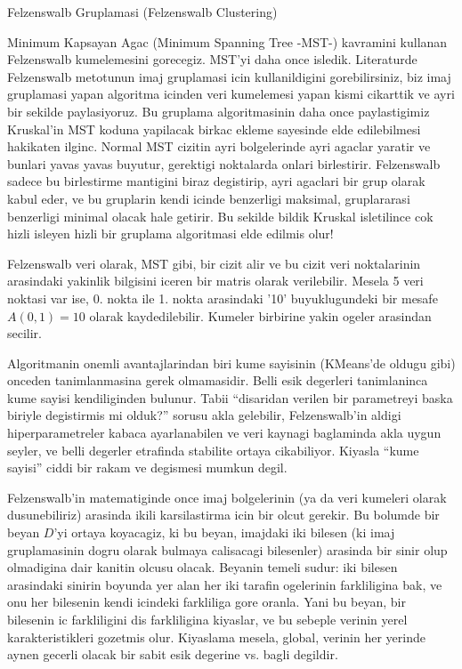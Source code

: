 \documentclass[12pt,fleqn]{article}\usepackage{../common}
\begin{document}
Felzenswalb Gruplamasi (Felzenswalb Clustering)

Minimum Kapsayan Agac (Minimum Spanning Tree -MST-) kavramini kullanan
Felzenswalb kumelemesini gorecegiz. MST'yi daha once isledik. Literaturde
Felzenswalb metotunun imaj gruplamasi icin kullanildigini gorebilirsiniz,
biz imaj gruplamasi yapan algoritma icinden veri kumelemesi yapan kismi
cikarttik ve ayri bir sekilde paylasiyoruz. Bu gruplama algoritmasinin daha
once paylastigimiz Kruskal'in MST koduna yapilacak birkac ekleme sayesinde
elde edilebilmesi hakikaten ilginc. Normal MST cizitin ayri bolgelerinde
ayri agaclar yaratir ve bunlari yavas yavas buyutur, gerektigi noktalarda
onlari birlestirir. Felzenswalb sadece bu birlestirme mantigini biraz
degistirip, ayri agaclari bir grup olarak kabul eder, ve bu gruplarin kendi
icinde benzerligi maksimal, gruplararasi benzerligi minimal olacak hale
getirir. Bu sekilde bildik Kruskal isletilince cok hizli isleyen hizli bir
gruplama algoritmasi elde edilmis olur!

Felzenswalb veri olarak, MST gibi, bir cizit alir ve bu cizit veri
noktalarinin arasindaki yakinlik bilgisini iceren bir matris olarak
verilebilir. Mesela 5 veri noktasi var ise, 0. nokta ile 1. nokta
arasindaki '10' buyuklugundeki bir mesafe $A(0,1) = 10$ olarak
kaydedilebilir. Kumeler birbirine yakin ogeler arasindan secilir.

Algoritmanin onemli avantajlarindan biri kume sayisinin (KMeans'de oldugu
gibi) onceden tanimlanmasina gerek olmamasidir. Belli esik degerleri
tanimlaninca kume sayisi kendiliginden bulunur. Tabii ``disaridan verilen
bir parametreyi baska biriyle degistirmis mi olduk?'' sorusu akla
gelebilir, Felzenswalb'in aldigi hiperparametreler kabaca ayarlanabilen ve
veri kaynagi baglaminda akla uygun seyler, ve belli degerler etrafinda
stabilite ortaya cikabiliyor. Kiyasla ``kume sayisi'' ciddi bir rakam ve
degismesi mumkun degil. 

Felzenswalb'in matematiginde once imaj bolgelerinin (ya da veri kumeleri
olarak dusunebiliriz) arasinda ikili karsilastirma icin bir olcut
gerekir. Bu bolumde bir beyan $D$'yi ortaya koyacagiz, ki bu beyan,
imajdaki iki bilesen (ki imaj gruplamasinin dogru olarak bulmaya calisacagi
bilesenler) arasinda bir sinir olup olmadigina dair kanitin olcusu
olacak. Beyanin temeli sudur: iki bilesen arasindaki sinirin boyunda yer
alan her iki tarafin ogelerinin farkliligina bak, ve onu her bilesenin
kendi icindeki farkliliga gore oranla. Yani bu beyan, bir bilesenin ic
farkliligini dis farkliligina kiyaslar, ve bu sebeple verinin yerel
karakteristikleri gozetmis olur. Kiyaslama mesela, global, verinin her
yerinde aynen gecerli olacak bir sabit esik degerine vs. bagli degildir.
\end{document}
